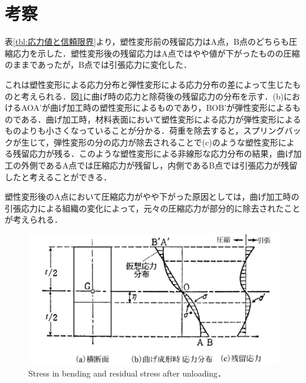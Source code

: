 \section{考察}
表\ref{tbl:応力値と信頼限界}より，塑性変形前の残留応力はA点，B点のどちらも圧縮応力を示した．塑性変形後の残留応力はA点ではやや値が下がったものの圧縮のままであったが，B点では引張応力に変化した．

これは塑性変形による応力分布と弾性変形による応力分布の差によって生じたものと考えられる．図\ref{fig:応力分布}に曲げ時の応力と除荷後の残留応力の分布を示す．(b)におけるAOA'が曲げ加工時の塑性変形によるものであり，BOB'が弾性変形によるものである．曲げ加工時，材料表面において塑性変形による応力が弾性変形によるものよりも小さくなっていることが分かる．荷重を除去すると，スプリングバックが生じて，弾性変形の分の応力が除去されることで(c)のような塑性変形による残留応力が残る．このような塑性変形による非線形な応力分布の結果，曲げ加工の外側であるA点では圧縮応力が残留し，内側であるB点では引張応力が残留したと考えることができる．

塑性変形後のA点において圧縮応力がやや下がった原因としては，曲げ加工時の引張応力による組織の変化によって，元々の圧縮応力が部分的に除去されたことが考えられる．
\clearpage
\begin{figure}[htbp]
    \centering %
    \includegraphics[width=100truemm,clip]{fig/応力分布.png}
    \caption{Stress in bending and residual stress after unloading．\cite{応力分布}}
    \label{fig:応力分布}
\end{figure}



